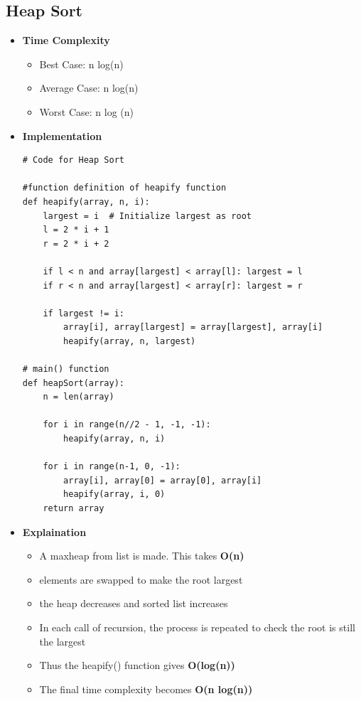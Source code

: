 \documentclass{article}
\begin{document}
\clearpage
\subsection{Heap Sort}
\begin{itemize}
    \item \textbf{Time Complexity}
        \begin{itemize}
            \item Best Case: n log(n)
            \item Average Case: n log(n)
            \item Worst Case: n log (n)
        \end{itemize}
    \item \textbf{Implementation}
\begin{verbatim}
# Code for Heap Sort

#function definition of heapify function
def heapify(array, n, i):
    largest = i  # Initialize largest as root
    l = 2 * i + 1
    r = 2 * i + 2

    if l < n and array[largest] < array[l]: largest = l
    if r < n and array[largest] < array[r]: largest = r
        
    if largest != i:
        array[i], array[largest] = array[largest], array[i]
        heapify(array, n, largest)    

# main() function
def heapSort(array):
    n = len(array)

    for i in range(n//2 - 1, -1, -1):
        heapify(array, n, i)      

    for i in range(n-1, 0, -1):
        array[i], array[0] = array[0], array[i]
        heapify(array, i, 0)
    return array      
\end{verbatim}
    \item \textbf{Explaination}
    \begin{itemize}
        \item A maxheap from list is made. This takes \textbf{O(n)}
        \item elements are swapped to make the root largest
        \item the heap decreases and sorted list increases
        \item In each call of recursion, the process is repeated to check the root is still the largest
        \item Thus the heapify() function gives \textbf{O(log(n))}
        \item The final time complexity becomes \textbf{O(n log(n))}
    \end{itemize}
\end{itemize}
\end{document}
